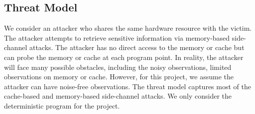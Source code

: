



\subsection{Threat Model}
We consider an attacker who shares the same hardware resource with the victim. 
The attacker attempts to retrieve sensitive information via memory-based 
side-channel attacks. 
The attacker has no direct access to the memory or cache but can probe the 
memory or cache at each program point. In reality, the attacker will face 
many possible obstacles,
including the noisy observations, limited observations on memory or cache.
However, for this project, we assume the attacker can have noise-free observations. 
The threat model captures most of the cache-based and memory-based side-channel attacks.
We only consider the deterministic program for the project.
